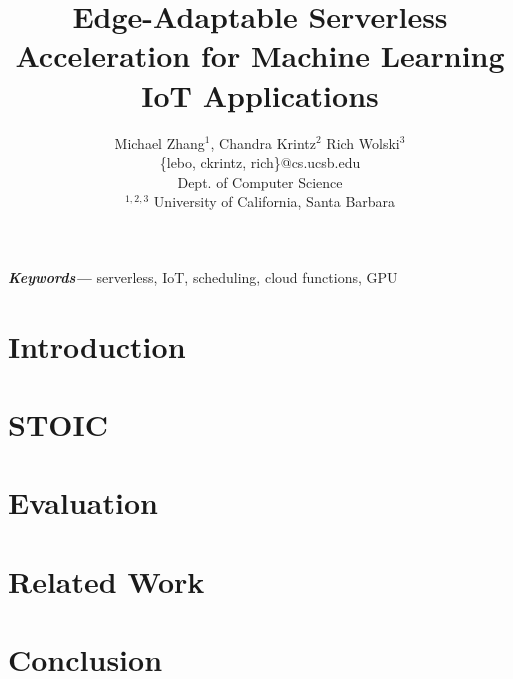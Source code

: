 \documentclass[12pt, onecolumn]{article}
\title{Edge-Adaptable Serverless Acceleration for Machine Learning IoT Applications}
\author{Michael Zhang$^{1}$, Chandra Krintz$^{2}$ Rich Wolski$^{3}$ \\
        \small \{lebo, ckrintz, rich\}@cs.ucsb.edu \\
        \small Dept. of Computer Science \\
        \small $^{1,2,3}$ University of California, Santa Barbara \\
}
\date{} %
\providecommand{\keywords}[1]
{
  \small	
  \textbf{\textit{Keywords---}} #1
}
\begin{document}
\maketitle

\begin{abstract}
\label{sec:abstract}

\end{abstract}

\keywords{serverless, IoT, scheduling, cloud functions, GPU}



\section{Introduction}
\label{sec:intro}


\section{STOIC}
\label{sec:stoic}


\section{Evaluation}
\label{sec:results}


\section{Related Work}
\label{sec:related}



\section{Conclusion}
\label{sec:conc}








\end{document}

